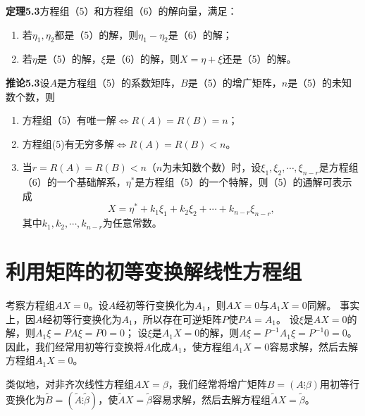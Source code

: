 \documentclass{article}
\begin{document}
\textbf{定理5.3}\quad 方程组（5）和方程组（6）的解向量，满足：
\begin{enumerate}
    \item 若$\eta_1,\eta_2$都是（5）的解，则$\eta_1-\eta_2$是（6）的解；
    \item 若$\eta$是（5）的解，$\xi$是（6）的解，则$X=\eta+\xi$还是（5）的解。
\end{enumerate}

\textbf{推论5.3}\quad 设$A$是方程组（5）的系数矩阵，$B$是（5）的增广矩阵，$n$是（5）的未知数个数，则
\begin{enumerate}
    \item 方程组（5）有唯一解$\iff R(A)=R(B)=n$；
    \item 方程组(5)有无穷多解$\iff R(A)=R(B)<n$。
    \item 当$r=R(A)=R(B)<n$（$n$为未知数个数）时，设$\xi_1,\xi_2,\cdots,\xi_{n-r}$是方程组（6）的一个基础解系，$\eta^*$是方程组（5）的一个特解，则（5）的通解可表示成
    \[
    X=\eta^*+k_1\xi_1+k_2\xi_2+\cdots+k_{n-r}\xi_{n-r}, \tag{7}
    \]
    其中$k_1,k_2,\cdots,k_{n-r}$为任意常数。
\end{enumerate}

\section{利用矩阵的初等变换解线性方程组}
考察方程组$AX=0$。设$A$经初等行变换化为$A_1$，则$AX=0$与$A_1X=0$同解。
事实上，因$A$经初等行变换化为$A_1$，所以存在可逆矩阵$P$使$PA=A_1$。
设$\xi$是$AX=0$的解，则$A_1\xi=PA\xi=P0=0$；
设$\xi$是$A_1X=0$的解，则$A\xi=P^{-1}A_1\xi=P^{-1}0=0$。
因此，我们经常用初等行变换将$A$化成$A_1$，使方程组$A_1X=0$容易求解，然后去解方程组$A_1X=0$。

类似地，对非齐次线性方程组$AX=\beta$，我们经常将增广矩阵$B=(A\vdots\beta)$用初等行变换化为$\tilde{B}=(\tilde{A}\vdots\tilde{\beta})$，使$\tilde{A}X=\tilde{\beta}$容易求解，然后去解方程组$\tilde{A}X=\tilde{\beta}$。
\end{document}
